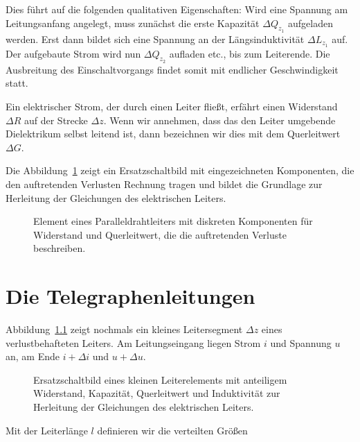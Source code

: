 \documentclass[paper=a4, parskip=half-, ngerman, fontsize=11pt]{scrreprt}
\begin{document}
Dies führt auf die folgenden qualitativen Eigenschaften: Wird eine Spannung am Leitungsanfang angelegt, muss zunächst
die erste Kapazität $\Delta Q_{z_{1}}$ aufgeladen werden. Erst dann bildet sich eine Spannung an der Längsinduktivität
$\Delta L_{z_{1}}$ auf. Der aufgebaute Strom wird nun $\Delta Q_{z_{2}}$ aufladen etc., bis zum Leiterende. Die
Ausbreitung des Einschaltvorgangs findet somit mit endlicher Geschwindigkeit statt.

Ein elektrischer Strom, der durch einen Leiter fließt, erfährt einen Widerstand $\Delta R$ auf der Strecke
$\Delta z$. Wenn wir annehmen, dass das den Leiter umgebende Dielektrikum selbst leitend ist, dann bezeichnen wir
dies mit dem Querleitwert $\Delta G$.

Die Abbildung~\ref{Leitung3} zeigt ein Ersatzschaltbild mit eingezeichneten Komponenten, die den auftretenden Verlusten
Rechnung tragen und bildet die Grundlage zur Herleitung der Gleichungen des elektrischen Leiters.

\begin{figure}[!htb]
    \begin{center}
        
        \caption{Element eines Paralleldrahtleiters mit diskreten Komponenten für Widerstand und Querleitwert, die die
        auftretenden Verluste beschreiben.}
        \label{Leitung3}
    \end{center}
\end{figure}



\chapter{Die Telegraphenleitungen}
Abbildung~\ref{Leitung4} zeigt nochmals ein kleines Leitersegment $\Delta z$ eines verlustbehafteten Leiters. Am
Leitungseingang liegen Strom $i$ und Spannung $u$ an, am Ende \mbox{$i + \Delta i$} und
\mbox{$u + \Delta u$}.
\begin{figure}[!htb]
    \begin{center}
        
        \caption{Ersatzschaltbild eines kleinen Leiterelements mit anteiligem Widerstand, Kapazität, Querleitwert und
        Induktivität zur Herleitung der Gleichungen des elektrischen Leiters.}
        \label{Leitung4}
    \end{center}
\end{figure}

Mit der Leiterlänge $l$ definieren wir die verteilten Größen
\end{document}

